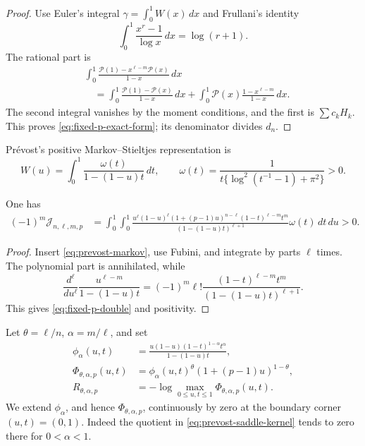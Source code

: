 \begin{proof}
Use Euler's integral \(\gamma=\int_0^1W(x)\,dx\) and Frullani's identity
\[
 \int_0^1\frac{x^r-1}{\log x}\,dx=\log(r+1).
\]
The rational part is
\begin{align*}
 &\int_0^1\frac{\mathcal P(1)-x^{\ell-m}\mathcal P(x)}{1-x}\,dx\\
 &\quad=\int_0^1\frac{\mathcal P(1)-\mathcal P(x)}{1-x}\,dx
 +\int_0^1\mathcal P(x)\frac{1-x^{\ell-m}}{1-x}\,dx.
\end{align*}
The second integral vanishes by the moment conditions, and the first is
\(\sum c_kH_k\).  This proves \eqref{eq:fixed-p-exact-form}; its denominator
divides \(d_n\).
\end{proof}

Pr\'evost's positive Markov--Stieltjes representation is
\begin{equation}\label{eq:prevost-markov}
 W(u)=\int_0^1\frac{\omega(t)}{1-(1-u)t}\,dt,
 \qquad
 \omega(t)=\frac1{t\{\log^2(t^{-1}-1)+\pi^2\}}>0.
\end{equation}

\begin{proposition}
\label{prop:fixed-p-positive}
One has
\begin{align}
 (-1)^m\mathcal J_{n,\ell,m,p}
 &=\int_0^1\!\int_0^1
 \frac{u^\ell(1-u)^\ell
 (1+(p-1)u)^{n-\ell}
 (1-t)^{\ell-m}t^m}
 {(1-(1-u)t)^{\ell+1}}
 \omega(t)\,dt\,du>0.
 \label{eq:fixed-p-double}
\end{align}
\end{proposition}

\begin{proof}
Insert \eqref{eq:prevost-markov}, use Fubini, and integrate by parts
\(\ell\) times.  The polynomial part is annihilated, while
\[
 \frac{d^\ell}{du^\ell}
 \frac{u^{\ell-m}}{1-(1-u)t}
 =(-1)^m\ell!\frac{(1-t)^{\ell-m}t^m}
 {(1-(1-u)t)^{\ell+1}}.
\]
This gives \eqref{eq:fixed-p-double} and positivity.
\end{proof}

Let \(\theta=\ell/n\), \(\alpha=m/\ell\), and set
\begin{align}
 \phi_\alpha(u,t)&=
 \frac{u(1-u)(1-t)^{1-\alpha}t^\alpha}
 {1-(1-u)t},\label{eq:prevost-saddle-kernel}\\
 \Phi_{\theta,\alpha,p}(u,t)&=
 \phi_\alpha(u,t)^\theta
 (1+(p-1)u)^{1-\theta},\label{eq:fixed-p-saddle}\\
 R_{\theta,\alpha,p}&=-\log\max_{0\le u,t\le1}
 \Phi_{\theta,\alpha,p}(u,t).
\end{align}
We extend \(\phi_\alpha\), and hence
\(\Phi_{\theta,\alpha,p}\), continuously by zero at the boundary corner
\((u,t)=(0,1)\).  Indeed the quotient in
\eqref{eq:prevost-saddle-kernel} tends to zero there for
\(0<\alpha<1\).

